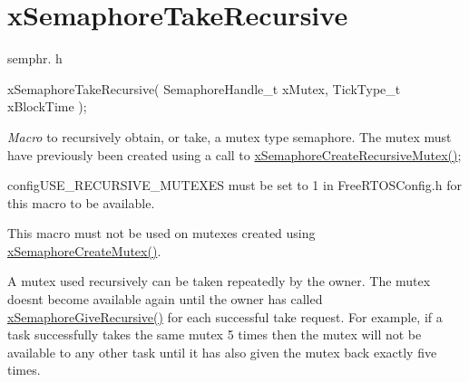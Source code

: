 \hypertarget{group__x_semaphore_take_recursive}{}\section{x\+Semaphore\+Take\+Recursive}
\label{group__x_semaphore_take_recursive}
semphr. h 
\begin{DoxyPre}
xSemaphoreTakeRecursive(
                         SemaphoreHandle\_t xMutex,
                         TickType\_t xBlockTime
                       );
\end{DoxyPre}


{\itshape Macro} to recursively obtain, or \textquotesingle{}take\textquotesingle{}, a mutex type semaphore. The mutex must have previously been created using a call to \hyperlink{vendor_2ceedling_2plugins_2freertos_2src_2freertos_2include_2semphr_8h_a1bbc843be5a41ea83d2693b2189fc0f8}{x\+Semaphore\+Create\+Recursive\+Mutex()};

config\+U\+S\+E\+\_\+\+R\+E\+C\+U\+R\+S\+I\+V\+E\+\_\+\+M\+U\+T\+E\+X\+ES must be set to 1 in Free\+R\+T\+O\+S\+Config.\+h for this macro to be available.

This macro must not be used on mutexes created using \hyperlink{vendor_2ceedling_2plugins_2freertos_2src_2freertos_2include_2semphr_8h_aa6a00aa9b91a9e5b3ebe4ae1c3f115c6}{x\+Semaphore\+Create\+Mutex()}.

A mutex used recursively can be \textquotesingle{}taken\textquotesingle{} repeatedly by the owner. The mutex doesn\textquotesingle{}t become available again until the owner has called \hyperlink{vendor_2ceedling_2plugins_2freertos_2src_2freertos_2include_2semphr_8h_a398d66b17856c22dd49d39aaac42f105}{x\+Semaphore\+Give\+Recursive()} for each successful \textquotesingle{}take\textquotesingle{} request. For example, if a task successfully \textquotesingle{}takes\textquotesingle{} the same mutex 5 times then the mutex will not be available to any other task until it has also \textquotesingle{}given\textquotesingle{} the mutex back exactly five times.


